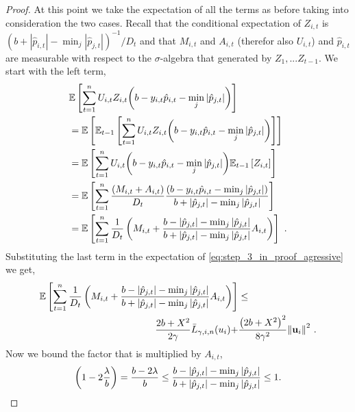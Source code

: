 {\begin{proof}
At this point we take  the expectation of all the terms as before taking into consideration the two cases.  Recall that the conditional expectation of $Z_{i,t}$ is
$(b+|\hat{p}_{i,t}|-\min_j| \hat{p}_{j,t}|)^{-1}/D_{t}$
and that $M_{i,t}$ and $A_{i,t}$ (therefor also $U_{i,t}$) and $\hat{p}_{i,t}$ are measurable with respect to the $\sigma$-algebra that generated by $Z_1,...Z_{t-1}$. 
We start with the left term,
\begin{align*}
\begin{split}
&\mathbb{E}\left[{\sum_{t=1}^{n}U_{i,t}Z_{i,t}{\left({b-y_{i,t}\hat{p}_{i,t}-\min_{j}{\left\vert{ \hat{p}_{j,t}}\right\vert}}\right)}}\right]\\
&=\mathbb{E}\left[{\mathbb{E}_{t-1}\left[{{\sum_{t=1}^{n}{U_{i,t}Z_{i,t}{\left(b-y_{i,t}\hat{p}_{i,t}-\min_{j}{\left\vert{\hat{p}_{j,t}}\right\vert}\right)}}}}\right]}\right] \\
&=\mathbb{E}\left[{{\sum_{t=1}^{n}U_{i,t}{\left({b -y_{i,t}\hat{p}_{i,t}}-\min_{j}{\left\vert \hat{p}_{j,t} \right\vert}\right)}\mathbb{E}_{t-1}\left[{ Z_{i,t}}\right]}}\right]\\
&=\mathbb{E}\left[{\sum_{t=1}^{n}\frac{\left({M_{i,t}+A_{i,t}}\right)}{D_{t}}\frac{\left({b -y_{i,t}\hat{p}_{i,t}-\min_{j}\left\vert{\hat{p}_{j,t}}\right\vert}\right)}{b+\left\vert{\hat{p}_{j,t}}\right\vert-\min_{j}{\left\vert{\hat{p}_{j,t}}\right\vert}}}\right]\\
&=\mathbb{E}\left[{\sum_{t=1}^{n}{\frac{1}{D_{t}}\left({M_{i,t}+\frac{b-\left\vert{\hat{p}_{j,t}}\right\vert-\min_{j}{\left\vert{\hat{p}_{j,t}}\right\vert }}{b+\left\vert{\hat{p}_{j,t}}\right\vert-\min_{j}{\left\vert{\hat{p}_{j,t}}\right\vert}}A_{i,t} }\right)}}\right]~.
\end{split}
\end{align*}
Substituting the last term in the expectation of
\eqref{eq:step_3_in_proof_agressive} we get,
\begin{equation}
\begin{split}
\mathbb{E}\left[ \sum_{t=1}^{n}{\frac{1}{D_{t}}}\left({M_{i,t}+\frac{b-\left\vert{\hat{p}_{j,t}}\right\vert-\min_{j}{\left\vert{\hat{p}_{j,t}}\right\vert }}{b+\left\vert{\hat{p}_{j,t}}\right\vert-\min_{j}{\left\vert{\hat{p}_{j,t}}\right\vert}}A_{i,t} }\right) \right]
&\le \\ \frac{2b+X^2}{2\gamma}{\bar
  L}_{\gamma,i,n}(u_i)+&\frac{\left({2b+X^2}\right)^2}{8{\gamma}^2}{\left\Vert
    \mathbf{u}_{i} \right\Vert}^2~.
\label{step_3_in_proof_aggressive}
\end{split}
\end{equation} 
Now we bound the factor that is multiplied by $A_{i,t}$,
\begin{equation}
\paren{1-2\frac{\lambda}{b}}=\frac{b-2\lambda}{b} \le\frac{b-\abs{\hat{p}_{j,t}}-\min_{j}{\abs{\hat{p}_{j,t}} }}{b+\abs{\hat{p}_{j,t}}-\min_{j}{\abs{\hat{p}_{j,t}}}}\le1.

\end{equation}
\end{proof}}

